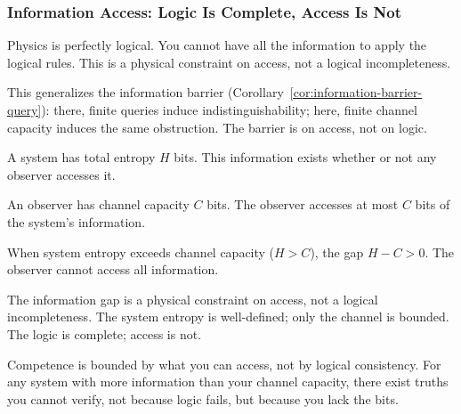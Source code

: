 \subsubsection{Information Access: Logic Is Complete, Access Is Not}\label{sec:information-access}

Physics is perfectly logical. You cannot have all the information to apply the logical rules. This is a physical constraint on access, not a logical incompleteness.

This generalizes the information barrier (Corollary~\ref{cor:information-barrier-query}): there, finite queries induce indistinguishability; here, finite channel capacity induces the same obstruction. The barrier is on access, not on logic.

\begin{definition}\label{def:system-information}
A system has total entropy $H$ bits. This information exists whether or not any observer accesses it.
\end{definition}

\begin{definition}\label{def:observer-channel}
An observer has channel capacity $C$ bits. The observer accesses at most $C$ bits of the system's information.
\end{definition}

\begin{theorem}\label{thm:information-gap}
When system entropy exceeds channel capacity ($H > C$), the gap $H - C > 0$. The observer cannot access all information.
\end{theorem}

\begin{theorem}\label{thm:gap-physical}
The information gap is a physical constraint on access, not a logical incompleteness. The system entropy is well-defined; only the channel is bounded. The logic is complete; access is not.
\end{theorem}

\begin{theorem}\label{thm:competence-access}
Competence is bounded by what you can access, not by logical consistency. For any system with more information than your channel capacity, there exist truths you cannot verify, not because logic fails, but because you lack the bits.
\end{theorem}

